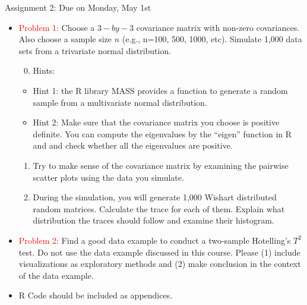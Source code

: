 \documentclass[
  ignorenonframetext,
]{beamer}
\providecommand{\tightlist}{%
  \setlength{\itemsep}{0pt}\setlength{\parskip}{0pt}}
\begin{document}
\begin{frame}{Assignment 2: Due on Monday, May 1st}
\protect\hypertarget{assignment-2-due-on-monday-may-1st}{}
\tiny

\begin{itemize}
\item
  \textcolor{red}{Problem 1}: Choose a \(3-by-3\) covariance matrix with
  non-zero covariances. Also choose a sample size \(n\) (e.g., n=100,
  500, 1000, etc). Simulate 1,000 data sets from a trivariate normal
  distribution.

  \begin{enumerate}
  \setcounter{enumi}{-1}
  \tightlist
  \item
    Hints:
  \end{enumerate}

  \begin{itemize}
  \tightlist
  \item
    Hint 1: the R library MASS provides a function to generate a random
    sample from a multivariate normal distribution.
  \item
    Hint 2: Make sure that the covariance matrix you choose is positive
    definite. You can compute the eigenvalues by the ``eigen'' function
    in R and and check whether all the eigenvalues are positive.
  \end{itemize}

  \begin{enumerate}
  \tightlist
  \item
    Try to make sense of the covariance matrix by examining the pairwise
    scatter plots using the data you simulate.
  \item
    During the simulation, you will generate 1,000 Wishart distributed
    random matrices. Calculate the trace for each of them. Explain what
    distribution the traces should follow and examine their histogram.
  \end{enumerate}
\item
  \textcolor{red}{Problem 2}: Find a good data example to conduct a
  two-sample Hotelling's \(T^2\) test. Do not use the data example
  discussed in this course. Please (1) include visualizations as
  exploratory methods and (2) make conclusion in the context of the data
  example.
\item
  R Code should be included as appendices.
\end{itemize}

\normalsize
\end{frame}
\end{document}
